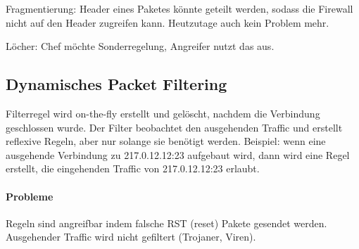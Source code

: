 Fragmentierung: Header eines Paketes könnte geteilt werden, sodass die Firewall nicht auf
den Header zugreifen kann.
Heutzutage auch kein Problem mehr.

Löcher: Chef möchte Sonderregelung, Angreifer nutzt das aus.

\subsection{Dynamisches Packet Filtering}%
\label{sub:dynamisches_packet_filtering}

Filterregel wird on-the-fly erstellt und gelöscht, nachdem die Verbindung geschlossen
wurde.
Der Filter beobachtet den ausgehenden Traffic und erstellt reflexive Regeln, aber nur
solange sie benötigt werden.
Beispiel: wenn eine ausgehende Verbindung zu 217.0.12.12:23 aufgebaut wird, dann wird eine
Regel erstellt, die eingehenden Traffic von 217.0.12.12:23 erlaubt.

\paragraph{Probleme}%
\label{par:probleme}

Regeln sind angreifbar indem falsche RST (reset) Pakete gesendet werden.
Ausgehender Traffic wird nicht gefiltert (Trojaner, Viren).
